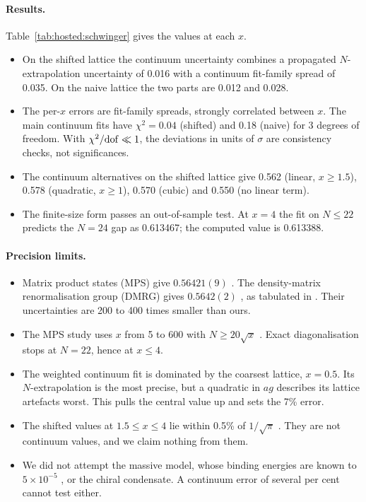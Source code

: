 \paragraph{Results.} Table~\ref{tab:hosted:schwinger} gives the values at each $x$.
\begin{itemize}[nosep]
\item On the shifted lattice the continuum uncertainty combines a propagated $N$-extrapolation uncertainty of 0.016 with a continuum
fit-family spread of 0.035. On the naive lattice the two parts are 0.012 and 0.028.
\item The per-$x$ errors are fit-family spreads, strongly correlated between $x$. The main continuum fits have $\chi^2=0.04$ (shifted) and
0.18 (naive) for 3 degrees of freedom. With $\chi^2/{\rm dof}\ll1$, the deviations in units of $\sigma$ are consistency checks, not
significances.
\item The continuum alternatives on the shifted lattice give 0.562 (linear, $x\ge1.5$), 0.578 (quadratic, $x\ge1$), 0.570 (cubic) and
0.550 (no linear term).
\item The finite-size form passes an out-of-sample test. At $x=4$ the fit on $N\le22$ predicts the $N=24$ gap as 0.613467; the computed
value is 0.613388.
\end{itemize}

\paragraph{Precision limits.}
\begin{itemize}[nosep]
\item Matrix product states (MPS) give $0.56421(9)$ \cite{banuls2013}. The density-matrix renormalisation group (DMRG) gives $0.5642(2)$
\cite{byrnes2002}, as tabulated in \cite{banuls2013}. Their uncertainties are 200 to 400 times smaller than ours.
\item The MPS study uses $x$ from 5 to 600 with $N\ge20\sqrt x$ \cite{banuls2013}. Exact diagonalisation stops at $N=22$, hence at
$x\le4$.
\item The weighted continuum fit is dominated by the coarsest lattice, $x=0.5$. Its $N$-extrapolation is the most precise, but a
quadratic in $ag$ describes its lattice artefacts worst. This pulls the central value up and sets the 7\% error.
\item The shifted values at $1.5\le x\le4$ lie within 0.5\% of $1/\sqrt\pi$ \cite{dempsey2022}. They are not continuum values, and we
claim nothing from them.
\item We did not attempt the massive model, whose binding energies are known to $5\times10^{-5}$ \cite{banuls2013}, or the chiral
condensate. A continuum error of several per cent cannot test either.
\end{itemize}

